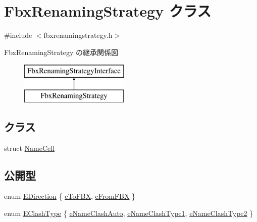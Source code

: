 \hypertarget{class_fbx_renaming_strategy}{}\section{Fbx\+Renaming\+Strategy クラス}
\label{class_fbx_renaming_strategy}


{\ttfamily \#include $<$fbxrenamingstrategy.\+h$>$}

Fbx\+Renaming\+Strategy の継承関係図\begin{figure}[H]
\begin{center}
\leavevmode
\includegraphics[height=2.000000cm]{class_fbx_renaming_strategy}
\end{center}
\end{figure}
\subsection*{クラス}
\begin{DoxyCompactItemize}
\item 
struct \hyperlink{struct_fbx_renaming_strategy_1_1_name_cell}{Name\+Cell}
\end{DoxyCompactItemize}
\subsection*{公開型}
\begin{DoxyCompactItemize}
\item 
enum \hyperlink{class_fbx_renaming_strategy_a68099d97d087f66edd2ea873e0dbf423}{E\+Direction} \{ \hyperlink{class_fbx_renaming_strategy_a68099d97d087f66edd2ea873e0dbf423a5090bf661dd42c70207cef715cbcee56}{e\+To\+F\+BX}, 
\hyperlink{class_fbx_renaming_strategy_a68099d97d087f66edd2ea873e0dbf423aa816a2056da21a8dedcffd502248d854}{e\+From\+F\+BX}
 \}
\item 
enum \hyperlink{class_fbx_renaming_strategy_aacebe214cec13a6cdbbc9e40d16c57dd}{E\+Clash\+Type} \{ \hyperlink{class_fbx_renaming_strategy_aacebe214cec13a6cdbbc9e40d16c57ddabf295c4337c8ee754ddda6386be6b4de}{e\+Name\+Clash\+Auto}, 
\hyperlink{class_fbx_renaming_strategy_aacebe214cec13a6cdbbc9e40d16c57dda692c1d6475ff91b487d8221fe7949495}{e\+Name\+Clash\+Type1}, 
\hyperlink{class_fbx_renaming_strategy_aacebe214cec13a6cdbbc9e40d16c57dda682028d5d582f5d5edf29fdb06a37803}{e\+Name\+Clash\+Type2}
 \}
\end{DoxyCompactItemize}
